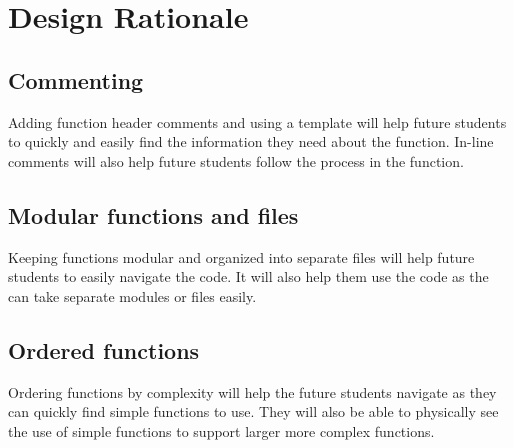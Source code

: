 \documentclass[10pt,letterpaper,onecolumn,draftclsnofoot]{IEEEtran}
\begin{document}
\section{Design Rationale}
\subsection{Commenting}
	Adding function header comments and using a template will help future students to quickly and easily find the information they need about the function. In-line comments will also help future students follow the process in the function.

\subsection{Modular functions and files}
	Keeping functions modular and organized into separate files will help future students to easily navigate the code. It will also help them use the code as the can take separate modules or files easily.

\subsection{Ordered functions}
	Ordering functions by complexity will help the future students navigate as they can quickly find simple functions to use. They will also be able to physically see the use of simple functions to support larger more complex functions.
\end{document}

